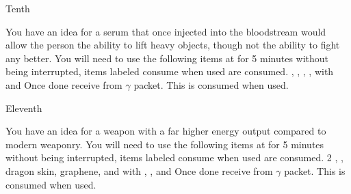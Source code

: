 \documentclass[greennotebook]{guildcamp3} %
\begin{document}
\begin{page}{Tenth}
	
	You have an idea for a serum that once injected into the bloodstream would allow the person the ability to lift heavy objects, though not the ability to fight any better.
	You will need to use the following items at \sSciWorkbench{} for 5 minutes without being interrupted, items labeled consume when used are consumed.
	\iCompoundNine{}, \iBloodPlasma{}, \iWerewolfFang{}, \iZirconia{}, \iGraphiteLube{} with \iMagnet{} and \iCentrifuge{}
	Once done receive \iSteroids{} from $\gamma$ packet. This is consumed when used. 
	
\end{page}

\begin{page}{Eleventh}
	
	You have an idea for a weapon with a far higher energy output compared to modern weaponry.
	You will need to use the following items at \sSciWorkbench{} for 5 minutes without being interrupted, items labeled consume when used are consumed.
	2 \iScrapMetal{}, \iNiobiumCarbide{}, dragon skin, graphene, and \iGraphiteLube{} with \iDiamondDrill{}, \iMultitool{}, and \iMonoBlade{}
	Once done receive \iUpgradedTechGun{} from $\gamma$ packet. This is consumed when used. 
	
\end{page}




\endnotebook
\end{document}
